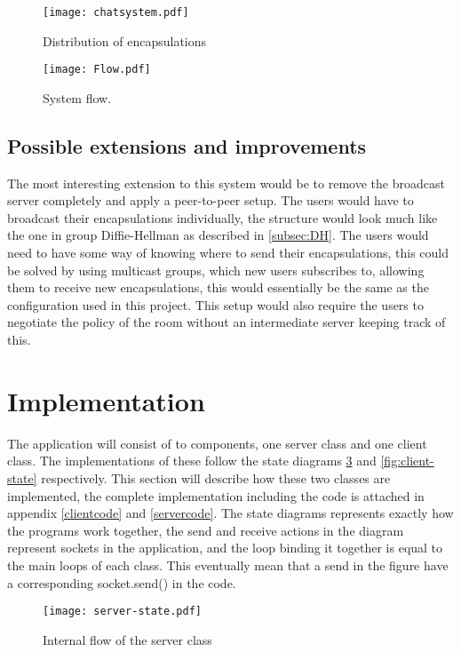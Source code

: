 \begin{figure}[H]
\centering
\texttt{[image: chatsystem.pdf]}
\caption{Distribution of encapsulations}
\label{fig:encapdistr}
\end{figure}

\begin{figure}[H]
\centering
\texttt{[image: Flow.pdf]}
\caption{System flow.}
\label{fig:flow}
\end{figure}


\subsection{Possible extensions and improvements}
The most interesting extension to this system would be to remove the broadcast server completely and apply a peer-to-peer setup. The users would have to broadcast their encapsulations individually, the structure would look much like the one in group Diffie-Hellman as described in \ref{subsec:DH}. The users would need to have some way of knowing where to send their encapsulations, this could be solved by using multicast groups, which new users subscribes to, allowing them to receive new encapsulations, this would essentially be the same as the configuration used in this project. This setup would also require the users to negotiate the policy of the room without an intermediate server keeping track of this. 

\newpage

\section{Implementation}
The application will consist of to components, one server class and one client class. The implementations of these follow the state diagrams \ref{fig:server-state} and \ref{fig:client-state} respectively. This section will describe how these two classes are implemented, the complete implementation including the code is attached in appendix \ref{clientcode} and \ref{servercode}. The state diagrams represents exactly how the programs work together, the send and receive actions in the diagram represent sockets in the application, and the loop binding it together is equal to the main loops of each class. This eventually mean that a send in the figure have a corresponding socket.send() in the code.

\begin{figure}
\centering
\texttt{[image: server-state.pdf]}
\caption{Internal flow of the server class}
\label{fig:server-state}
\end{figure}


